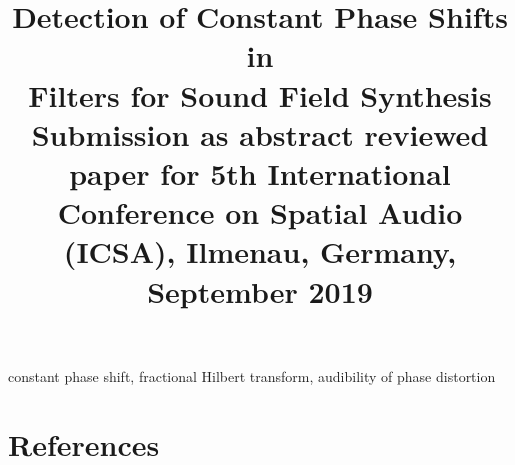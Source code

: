 \documentclass[conference,10pt]{IEEEtran}
\begin{document}
\title{Detection of Constant Phase Shifts in\\Filters for Sound Field Synthesis\\
{\footnotesize Submission as abstract reviewed paper for 5th International
Conference on Spatial Audio (ICSA), Ilmenau, Germany, September 2019}}
\author{
}
\maketitle
\thispagestyle{plain}
\pagestyle{plain}
\begin{abstract}

\end{abstract}
\begin{IEEEkeywords}
constant phase shift, fractional Hilbert transform, audibility of phase distortion
\end{IEEEkeywords}





\renewcommand\refname{}
\section{References}


\end{document}
